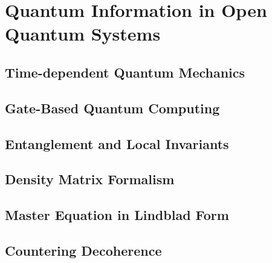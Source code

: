 \chapter{Quantum Information in Open Quantum Systems}
\label{chap:quantum}

\section{Time-dependent Quantum Mechanics}
\label{sec:quantum_tdse}

\section{Gate-Based Quantum Computing}
\label{sec:quantum_computing}


\section{Entanglement and Local Invariants}
\label{sec:C_LI}

\section{Density Matrix Formalism}
\label{sec:density_matrix_formalism}

\section{Master Equation in Lindblad Form}
\label{sec:quantum_master_eq}

\section{Countering Decoherence}
\label{sec:quantum_counter_decoherence}
